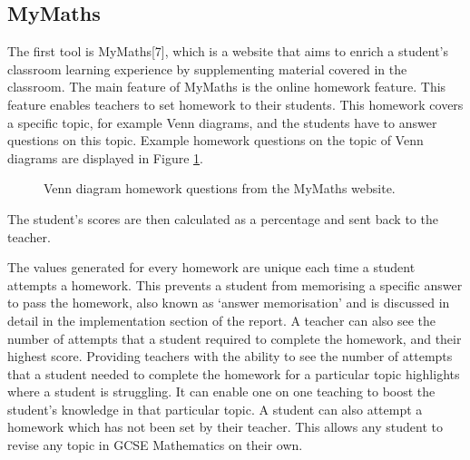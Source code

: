 \documentclass{article}
\begin{document}
\subsection{MyMaths}

The first tool is MyMaths[7], which is a website that aims to enrich a student's classroom learning experience by supplementing material covered in the classroom. The main feature of MyMaths is the online homework feature. This feature enables teachers to set homework to their students. This homework covers a specific topic, for example Venn diagrams, and the students have to answer questions on this topic. Example homework questions on the topic of Venn diagrams are displayed in Figure \ref{figure:mymathsHomeworkQuestion1}.

\begin{figure}[H]
	\centering
	\caption{Venn diagram homework questions from the MyMaths website.}
	\label{figure:mymathsHomeworkQuestion1}
\end{figure}

The student's scores are then calculated as a percentage and sent back to the teacher. \par

The values generated for every homework are unique each time a student attempts a homework. This prevents a student from memorising a specific answer to pass the homework, also known as `answer memorisation' and is discussed in detail in the implementation section of the report. A teacher can also see the number of attempts that a student required to complete the homework, and their highest score. Providing teachers with the ability to see the number of attempts that a student needed to complete the homework for a particular topic highlights where a student is struggling. It can enable one on one teaching to boost the student's knowledge in that particular topic. A student can also attempt a homework which has not been set by their teacher. This allows any student to revise any topic in GCSE Mathematics on their own. \par
\end{document}
